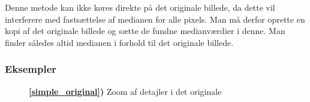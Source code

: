 {Denne metode kan ikke køres direkte på det originale billede, da dette
vil interferere med fastsættelse af medianen for alle pixels. Man må
derfor oprette en kopi af det originale billede og sætte de fundne
medianværdier i denne. Man finder således altid medianen i forhold til det
originale billede.

\subsubsection*{Eksempler}

\begin{figure}[!h]
    \centering
    \hspace{1em}
    \hspace{1em}
    \caption[]{
        \textbf{\ref{simple_original})} Zoom af detajler i det originale
}
\end{figure}}
